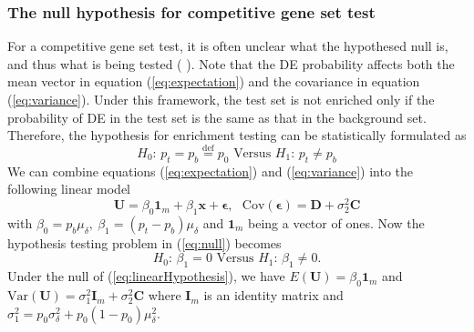 \documentclass[11pt, a4paper]{article}
\begin{document}
	\subsubsection*{The null hypothesis for competitive gene set test}\label{subsubsection:nullhypothesis}
	For a competitive gene set test, it is often unclear what the hypothesed null is, and thus what is being tested (\cite{barry2008statistical}  \citealp{wu2012camera}). Note that the DE probability affects both the mean vector in equation (\ref{eq:expectation}) and the covariance in equation (\ref{eq:variance}). Under this framework, the test set is not enriched only if the probability of DE in the test set is the same as that in the background set. Therefore, the hypothesis for enrichment testing can be statistically formulated as
	\begin{equation}\label{eq:null}
		H_0\text{: }  p_t = p_b \stackrel{\text{def}}{=}p_0  \text{ Versus } H_1 \text{: } p_t \neq p_b
	\end{equation}
	We can combine equations (\ref{eq:expectation}) and (\ref{eq:variance}) into the following linear model
	\begin{equation}\label{eq:linearModel}
		\bm U = \beta_0\bm 1_m + \beta_1\bm x + \bm \epsilon, \text{~~Cov}(\bm \epsilon) =  \bm D  + \sigma_2^2\bm C
	\end{equation} 
	with $ \beta_0 = p_b\mu_{\delta}, ~\beta_1 = (p_t-p_b)\mu_{\delta}$ and $\bm 1_m$ being a vector of ones. Now the hypothesis testing problem in (\ref{eq:null}) becomes 
	\begin{equation}\label{eq:linearHypothesis}
		H_0\text{: }  \beta_1 = 0   \text{ Versus } H_1 \text{: } \beta_1 \neq 0.
	\end{equation}
	Under the null of (\ref{eq:linearHypothesis}), we have $E(\bm U) = \beta_0\bm 1_m$ and $\text{Var}(\bm U) = \sigma^2_1\bm I_m + \sigma_2^2 \bm C$ where $\bm I_m$ is an identity matrix and $\sigma_1^2 = p_0\sigma^2_{\delta}+ p_0(1-p_0)\mu^2_{\delta}$.
	
\end{document}

